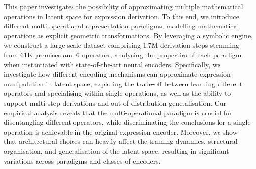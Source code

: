 This paper investigates the possibility of approximating multiple mathematical operations in latent space for expression derivation. To this end, we introduce different multi-operational representation paradigms, modelling mathematical operations as explicit geometric transformations. By leveraging a symbolic engine, we construct a large-scale dataset comprising 1.7M derivation steps stemming from 61K premises and 6 operators, analysing the properties of each paradigm when instantiated with state-of-the-art neural encoders. Specifically, we investigate how different encoding mechanisms can approximate expression manipulation in latent space, exploring the trade-off between learning different operators and specialising within single operations, as well as the ability to support multi-step derivations and out-of-distribution generalisation. Our empirical analysis reveals that the multi-operational paradigm is crucial for disentangling different operators, while discriminating the conclusions for a single operation is achievable in the original expression encoder. Moreover, we show that architectural choices can heavily affect the training dynamics, structural organisation, and generalisation of the latent space, resulting in significant variations across paradigms and classes of encoders.